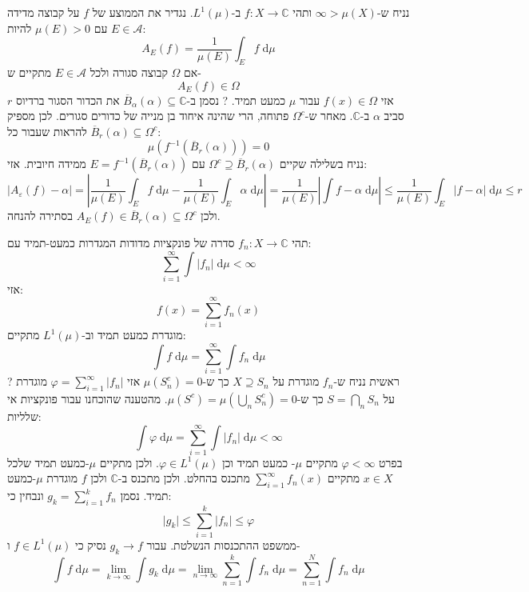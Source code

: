 \documentclass{tstextbook}
\begin{document}
\begin{proposition}
נניח ש-\(\infty> \mu(X)\) ותהי \(f:X\to \mathbb{C}\) ב-\(L^{1}\left( \mu \right)\). נגדיר את הממוצע של \(f\) על קבוצה מדידה  \(E \in \mathcal{A}\) עם \(\mu(E)> 0\) להיות:
$$A_{E}(f)=\frac{1}{\mu(E)}\int _E f \;\mathrm{d} \mu $$
אם \(\Omega\) קבוצה סגורה ולכל \(E \in \mathcal{A}\) מתקיים ש-
$$A_{E}(f)\in \Omega$$
אזי \(f(x) \in \Omega\) עבור \(\mu\) כמעט תמיד.
?
נסמן ב-\(\overline{B}_{\alpha}\left( \alpha \right)\subseteq \mathbb{C}\) את הכדור הסגור ברדיוס \(r\) סביב \(\alpha\) ב-\(\mathbb{C}\). מאחר ש-\(\Omega^{c}\) פתוחה, הרי שהינה איחוד בן מנייה של כדורים סגורים. לכן מספיק להראות שעבור כל \(\overline{B}_{r}\left( \alpha \right)\subseteq \Omega^{c}\):
$$\mu\left( f^{-1}\left( \overline{B} _{r}\left( \alpha  \right) \right) \right)=0$$
נניח בשלילה שקיים \(\Omega^{c}\supseteq \overline{B}_{r}\left( \alpha \right)\) עם \(E=f^{-1}\left( \overline{B}_{r}\left( \alpha \right) \right)\) ממידה חיובית. אזי:
$$\left\lvert  A_{\varepsilon}(f)-\alpha  \right\rvert =\left\lvert  \frac{1}{\mu(E)}\int _{E}f \;\mathrm{d} \mu -\frac{1}{\mu(E)}\int _{E}\alpha \;\mathrm{d} \mu \right\rvert=\frac{1}{\mu(E)}   \left\lvert  \int f-\alpha \;\mathrm{d} \mu   \right\rvert \leq \frac{1}{\mu(E)}\int _{E}\left\lvert  f-\alpha  \right\rvert  \;\mathrm{d} \mu \leq r$$
ולכן \(A_{E}(f)\in \overline{B}_{r}\left( \alpha \right) \subseteq \Omega^{c}\) בסתירה להנחה.

\end{proposition}
\begin{proposition}
תהי \(f_{n}:X\to \mathbb{C}\) סדרה של פונקציות מדודות המגדרות כמעט-תמיד עם:
$$\sum_{i=1}^{\infty} \int  \lvert f_{n} \rvert  \;\mathrm{d} \mu < \infty $$
אזי:
$$f(x)=\sum_{i=1}^{\infty} f_{n}(x)$$
מוגדרת כמעט תמיד וב-\(L^{1}\left( \mu \right)\) מתקיים:
$$\int f \;\mathrm{d} \mu = \sum_{i=1}^{\infty} \int f_{n} \;\mathrm{d} \mu  $$
?
ראשית נניח ש-\(f_{n}\) מוגדרת על \(X\supseteq S_{n}\) כך ש-\(\mu(S_{n}^{c})=0\) אזי \(\varphi=\sum_{i=1}^{\infty}\lvert f_{n} \rvert\) מוגדרת על \(S=\bigcap_{n}S_{n}\) כך ש-\(\mu(S^{c})=\mu\left( \bigcup_{n}S_{n}^{c} \right)=0\). מהטענה שהוכחנו עבור פונקציות אי שלליות:
$$\int \varphi \;\mathrm{d} \mu =\sum_{i=1}^{\infty} \int \lvert f_{n} \rvert  \;\mathrm{d} \mu < \infty $$
בפרט \(\varphi< \infty\) מתקיים \(\mu\)- כמעט תמיד וכן \(\varphi \in L^{1}\left( \mu \right)\). ולכן מתקיים \(\mu\)-כמעט תמיד שלכל \(x \in X\) מתקיים \(\sum_{i=1}^{\infty}f_{n}(x)\) מתכנס בהחלט. ולכן מתכנס ב-\(\mathbb{C}\) ולכן \(f\) מוגדרת \(\mu\)-כמעט תמיד. נסמן \(g_{k}=\sum_{i=1}^{k}f_{n}\) ונבחין כי:
$$\lvert g_{k} \rvert \leq \sum_{i=1}^{k} \lvert f_{n} \rvert \leq \varphi$$
ממשפט ההתכנסות הנשלטת. עבור \(g_{k}\to f\) נסיק כי \(f \in L^{1}\left( \mu \right)\) ו-
$$\int f \;\mathrm{d} \mu = \lim_{ k \to \infty } \int g_{k} \;\mathrm{d} \mu=\lim_{ n \to \infty } \sum_{n=1}^{k} \int  f_{n} \;\mathrm{d} \mu = \sum_{n=1}^{N} \int f_{n} \;\mathrm{d} \mu    $$

\end{proposition}
\end{document}
